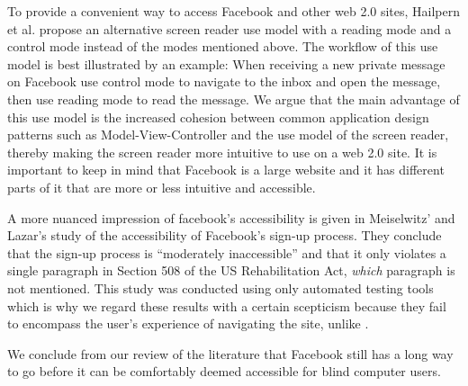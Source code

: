 \documentclass[conference]{IEEEtran}
\begin{document}
To provide a convenient way to access Facebook and other web 2.0 sites,
Hailpern et al\cite{hailpern2009}.  propose an alternative screen reader use
model with a reading mode and a control mode instead of the modes mentioned
above. The workflow of this use model is best illustrated by an example: When
receiving a new private message on Facebook use control mode to navigate to the
inbox and open the message, then use reading mode to read the message.  We
argue that the main advantage of this use model is the increased cohesion
between common application design patterns such as Model-View-Controller and
the use model of the screen reader, thereby making the screen reader more
intuitive to use on a web 2.0 site. It is important to keep in mind that
Facebook is a large website and it has different parts of it that are more or
less intuitive and accessible.

A more nuanced impression of facebook's accessibility is given in Meiselwitz'
and Lazar's \cite{meiselwitz2009} study of the accessibility of Facebook's
sign-up process. They conclude that the sign-up process is ``moderately
inaccessible'' and that it only violates a single paragraph in Section 508 of
the US Rehabilitation Act, \emph{which} paragraph is not mentioned. This study
was conducted using only automated testing tools which is why we regard these
results with a certain scepticism because they fail to encompass the user's
experience of navigating the site, unlike \cite{buzzi2010}.

We conclude from our review of the literature that Facebook still has a long
way to go before it can be comfortably deemed accessible for blind computer
users.


% 
% 
% 
% 
% 
% 
\end{document}
